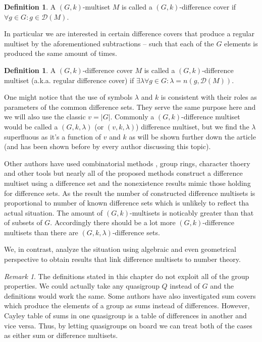 \documentclass{article}
\theoremstyle{plain}
\theoremstyle{definition}
\newtheorem{definition}[theorem]{Definition}
\theoremstyle{remark}
\newtheorem{remark}[theorem]{Remark}
\begin{document}
		\begin{definition}
			\label{dms:def:dc}
			A $(G,k)$-multiset $M$ is called a $(G,k)$-difference cover if $\forall g \in G \colon g \in \mathcal D(M)$.
		\end{definition}
		
		In particular we are interested in certain difference covers that produce a regular multiset by the aforementioned subtractions -- such that each of the $G$ elements is produced the same amount of times.
		
		\begin{definition}
			\label{dms:def:dms}
			A $(G,k)$-difference cover $M$ is called a $(G,k)$-difference multiset (a.k.a. regular difference cover) if $\exists \lambda  \forall g \in G \colon \lambda = n(g, \mathcal D(M))$.
		\end{definition}
		
		One might notice that the use of symbols $\lambda$ and $k$ is consistent with their roles as parameters of the common difference sets. They serve the same purpose here and we will also use the classic $v = |G|$. Commonly a $(G,k)$-difference multiset would be called a $(G,k,\lambda)$ (or $(v,k,\lambda)$) difference multiset, but we find the $\lambda$ superfluous as it's a function of $v$ and $k$ as will be shown further down the article (and has been shown before by every author discussing this topic).
		
		Other authors have used combinatorial methods \cite{buratti1999old}, group rings, character thoery \cite{arasu2005cyclic} and other tools \cite{arasu2005regular, momihara2009strong} but nearly all of the proposed methods construct a difference multiset using a difference set and the nonexistence results mimic those holding for difference sets. As the result the number of constructed difference multisets is proportional to number of known difference sets which is unlikely to reflect tha actual situation. The amount of $(G,k)$-multisets is noticably greater than that of subsets of $G$. Accordingly there should be a lot more $(G,k)$-difference multisets than there are $(G,k,\lambda)$-difference sets.
		
		We, in contrast, analyze the situation using algebraic and even geometrical perspective to obtain results that link difference multisets to number theory.
		
		\begin{remark}
			\label{dms:remark:quasigroups}
			The definitions stated in this chapter do not exploit all of the group properties. We could actually take any quasigroup $Q$ instead of $G$ and the definitions would work the same. Some authors \cite{haanpaa2004minimum} have also investigated sum covers which produce the elements of a group as sums instead of differences. However, Cayley table of sums in one quasigroup is a table of differences in another and vice versa. Thus, by letting quasigroups on board we can treat both of the cases as either sum or difference multisets.
		\end{remark}
	
\end{document}
